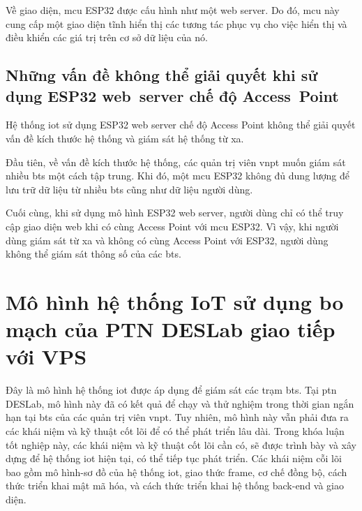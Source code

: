 Về giao diện, \acrshort{mcu} ESP32 được cấu hình như một web server. Do đó, \acrshort{mcu} này cung cấp một giao diện tĩnh hiển thị các tương tác phục vụ cho việc hiển thị và điều khiển các giá trị trên cơ sở dữ liệu của nó.

\subsection{Những vấn đề không thể giải quyết khi sử dụng ESP32 web~server chế độ Access~Point}

Hệ thống \acrshort{iot} sử dụng ESP32 web server chế độ Access Point không thể giải quyết vấn đề kích thước hệ thống và giám sát hệ thống từ xa.

Đầu tiên, về vấn đề kích thước hệ thống, các quản trị viên \acrshort{vnpt} muốn giám sát nhiều \acrshort{bts} một cách tập trung. Khi đó, một \acrshort{mcu} ESP32 không đủ dung lượng để lưu trữ dữ liệu từ nhiều \acrshort{bts} cũng như dữ liệu người dùng.

Cuối cùng, khi sử dụng mô hình ESP32 web server, người dùng chỉ có thể truy cập giao diện web khi có cùng Access Point với \acrshort{mcu} ESP32. Vì vậy, khi người dùng giám sát từ xa và không có cùng Access Point với ESP32, người dùng không thể giám sát thông số của các \acrshort{bts}.

\section{Mô hình hệ thống IoT sử dụng bo mạch của PTN DESLab giao tiếp với VPS}

Đây là mô hình hệ thống \acrshort{iot} được áp dụng để giám sát các trạm \acrshort{bts}. Tại \acrshort{ptn} DESLab, mô hình này đã có kết quả để chạy và thử nghiệm trong thời gian ngắn hạn tại \acrshort{bts} của các quản trị viên \acrshort{vnpt}. Tuy nhiên, mô hình này vẫn phải đưa ra các khái niệm và kỹ thuật cốt lõi để có thể phát triển lâu dài. Trong khóa luận tốt nghiệp này, các khái niệm và kỹ thuật cốt lõi cần có, sẽ được trình bày và xây dựng để hệ thống \acrshort{iot} hiện tại, có thể tiếp tục phát triển. Các khái niệm cỗi lõi bao gồm mô hình-sơ đồ của hệ thống \acrshort{iot}, giao thức frame, cơ chế đồng bộ, cách thức triển khai mật mã hóa, và cách thức triển khai hệ thống back-end và giao diện.

